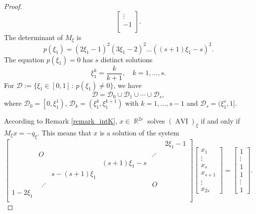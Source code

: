 \documentclass[smallextended,envcountsect]{svjour3}       %
\DeclareMathOperator{\AVI}{AVI}
\DeclareMathOperator{\R}{\mathbb{R}}
\begin{document}
\begin{proof}
$$\begin{bmatrix}
	\vdots\\
	-1\\
	\end{bmatrix}.$$
The determinant  of $M_\xi$ is $$p(\xi_1)=(2\xi_1-1)^2(3\xi_1-2)^2...((s+1)\xi_1-s)^2.$$
The equation $p(\xi_1)=0$ has $s$ distinct solutions  \begin{equation}\label{xi_k}
\xi_1^k=\frac{k}{k+1},\quad k=1,...,s.
\end{equation}
For $\mathcal{D}:=\{\xi_1\in [0,1]\,:\,p(\xi_1)\neq 0\}$, we have $$\mathcal{D}=\mathcal{D}_0\cup \mathcal{D}_1\cup \cdots \cup \mathcal{D}_s,$$ where $\mathcal{D}_0=\left[0 ,\xi_1^1\right)$, $\mathcal{D}_k=(\xi_1^k,\xi_1^{k+1})$ with $k=1,...,s-1$ and $\mathcal{D}_{s}=(\xi_1^s,1].$
	
According to Remark \ref{remark_intK}, $x\in \R^{2s}$ solves $(\AVI)_{\xi}$ if and only if $M_{\xi}x=-q_{\xi}$. This means that $x$ is a solution of the system
	\begin{equation}\label{system-f0}
	\begin{bmatrix}
	&  &  &&  & 2\xi_1-1  \\ 
	&   O& & 	  & \iddots \ \   &	\\ 
	&     && (s+1)\xi_1-s   &   &\\ 
	&    &s-(s+1)\xi_1& &  &	\\ 
	& \ \ \iddots   & && O  &\\ 
	1-2\xi_1& &&& &  \\ 
	\end{bmatrix} \begin{bmatrix}
	x_1 \\ 
	\vdots\\
	x_s\\
	x_{s+1}\\
	\vdots\\
	x_{2s}
	\end{bmatrix}=\begin{bmatrix}
	1\\ 
	\vdots\\
	1\\
	1\\
	\vdots\\
	1
	\end{bmatrix}. 
	\end{equation}


\end{proof}
\end{document}
